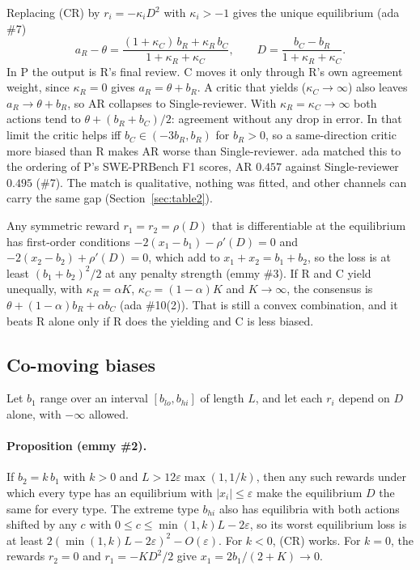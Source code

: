 \documentclass{article}
\begin{document}
Replacing (CR) by $r_i=-\kappa_i D^2$ with $\kappa_i>-1$ gives the unique
equilibrium (ada \#7)
\begin{equation*}
a_R-\theta=\frac{(1+\kappa_C)\,b_R+\kappa_R\,b_C}{1+\kappa_R+\kappa_C},
\qquad
D=\frac{b_C-b_R}{1+\kappa_R+\kappa_C}.
\end{equation*}
In P the output is R's final review. C moves it only through R's own
agreement weight, since $\kappa_R=0$ gives $a_R=\theta+b_R$. A critic that
yields ($\kappa_C\to\infty$) also leaves $a_R\to\theta+b_R$, so AR
collapses to Single-reviewer. With $\kappa_R=\kappa_C\to\infty$ both
actions tend to $\theta+(b_R+b_C)/2$: agreement without any drop in error.
In that limit the critic helps iff $b_C\in(-3b_R,b_R)$ for $b_R>0$, so a
same-direction critic more biased than R makes AR worse than
Single-reviewer. ada matched this to the ordering of P's SWE-PRBench F1
scores, AR $0.457$ against Single-reviewer $0.495$ (\#7). The match is
qualitative, nothing was fitted, and other channels can carry the same
gap (Section~\ref{sec:table2}).

Any symmetric reward $r_1=r_2=\rho(D)$ that is differentiable at the
equilibrium has first-order conditions $-2(x_1-b_1)-\rho'(D)=0$ and
$-2(x_2-b_2)+\rho'(D)=0$, which add to $x_1+x_2=b_1+b_2$, so the loss is
at least $(b_1+b_2)^2/2$ at any penalty strength (emmy \#3). If R and C
yield unequally, with $\kappa_R=\alpha K$, $\kappa_C=(1-\alpha)K$ and
$K\to\infty$, the consensus is $\theta+(1-\alpha)b_R+\alpha b_C$ (ada
\#10(2)). That is still a convex combination, and it beats R alone only if
R does the yielding and C is less biased.

\subsection{Co-moving biases}\label{sec:comove}

Let $b_1$ range over an interval $[b_{lo},b_{hi}]$ of length $L$, and let
each $r_i$ depend on $D$ alone, with $-\infty$ allowed.

\paragraph{Proposition (emmy \#2).} If $b_2=k\,b_1$ with $k>0$ and
$L>12\varepsilon\max(1,1/k)$, then any such rewards under which every
type has an equilibrium with $|x_i|\le\varepsilon$ make the equilibrium
$D$ the same for every type. The extreme type $b_{hi}$ also has
equilibria with both actions shifted by any $c$ with
$0\le c\le\min(1,k)L-2\varepsilon$, so its worst equilibrium loss is at
least $2(\min(1,k)L-2\varepsilon)^2-O(\varepsilon)$. For $k<0$, (CR)
works. For $k=0$, the rewards $r_2=0$ and $r_1=-KD^2/2$ give
$x_1=2b_1/(2+K)\to0$.
\end{document}
